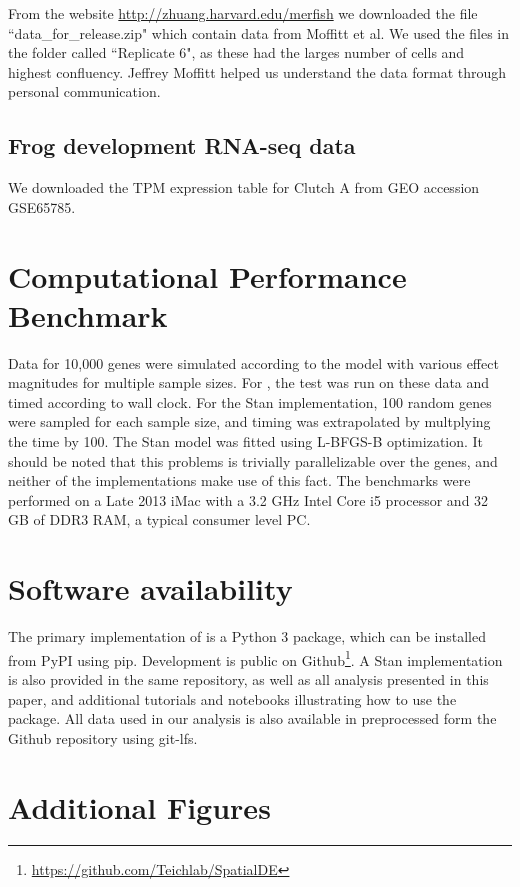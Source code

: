 From the website \url{http://zhuang.harvard.edu/merfish} we downloaded the file ``data\_for\_release.zip" which contain data from Moffitt et al. We used the files in the folder called ``Replicate 6", as these had the larges number of cells and highest confluency. Jeffrey Moffitt helped us understand the data format through personal communication.

\subsection{Frog development RNA-seq data}

We downloaded the TPM expression table for Clutch A from GEO accession GSE65785.

\section{Computational Performance Benchmark}
Data for 10,000 genes were simulated according to the  model with various effect magnitudes for multiple sample sizes. For , the test was run on these data and timed according to wall clock. For the Stan implementation, 100 random genes were sampled for each sample size, and timing was extrapolated by multplying the time by 100. The Stan model was fitted using L-BFGS-B optimization. It should be noted that this problems is trivially parallelizable over the genes, and neither of the implementations make use of this fact. The benchmarks were performed on a Late 2013 iMac with a 3.2 GHz Intel Core i5 processor and 32 GB of DDR3 RAM, a typical consumer level PC.

\section{Software availability}

The primary implementation of  is a Python 3 package, which can be installed from PyPI using pip. Development is public on Github\footnote{\url{https://github.com/Teichlab/SpatialDE}}. A Stan implementation is also provided in the same repository, as well as all analysis presented in this paper, and additional tutorials and notebooks illustrating how to use the package. All data used in our analysis is also available in preprocessed form the Github repository using git-lfs.



\section{Additional Figures}

